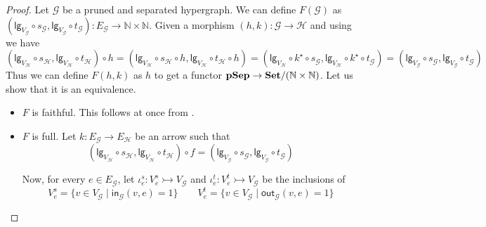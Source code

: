 \documentclass[3p]{elsarticle}
\newcommand{\lgh}{\mathsf{lg}}
\newcommand{\ind}[1]{\mathsf{in}_{\mathcal{#1}}}
\newcommand{\outd}[1]{\mathsf{out}_{\mathcal{#1}}}
\newcommand{\Set}{\mathbf{Set}}
\newcommand{\catname}[1]{\textbf{\textup{#1}}}
\newcommand{\pshyp}{\catname{pSep}}
\newcommand{\mto}{\rightarrowtail}
\theoremstyle{remark}
\theoremstyle{definition}
\begin{document}
\begin{proof}{\label{proof:pruned}}
	Let $\mathcal{G}$ be a pruned and separated hypergraph. We can define $F(\mathcal{G})$ as $(\lgh_{V_{\mathcal{G}}}\circ s_{\mathcal{G}}, \lgh_{V_{\mathcal{G}}}\circ t_{\mathcal{G}}) \colon E_{\mathcal{G}}\to \mathbb{N}\times \mathbb{N}$. Given a morphism $(h,k)\colon \mathcal{G}\to \mathcal{H}$ and using  we	have
	\[(\lgh_{V_{\mathcal{H}}}\circ s_{\mathcal{H}}, \lgh_{V_{\mathcal{H}}}\circ t_{\mathcal{H}})\circ h = (\lgh_{V_{\mathcal{H}}}\circ s_{\mathcal{H}}\circ h, \lgh_{V_{\mathcal{H}}}\circ t_{\mathcal{H}}\circ h)=(\lgh_{V_{\mathcal{H}}}\circ k^\star\circ s_{\mathcal{G}}, \lgh_{V_{\mathcal{H}}}\circ k^\star\circ t_{\mathcal{G}})= (\lgh_{V_{\mathcal{G}}}\circ s_{\mathcal{G}}, \lgh_{V_{\mathcal{G}}}\circ t_{\mathcal{G}})\]
	Thus we can define $F(h,k)$ as $h$ to get a functor $\pshyp\to \Set/(\mathbb{N}\times \mathbb{N})$. Let us show that it is an equivalence.
	\begin{itemize}
		\item $F$ is faithful. This follows at once from .
		\item $F$ is full. Let $k\colon E_{\mathcal{G}}\to E_{\mathcal{H}}$ be an arrow such that 
		\[(\lgh_{V_{\mathcal{H}}}\circ s_{\mathcal{H}}, \lgh_{V_{\mathcal{H}}}\circ t_{\mathcal{H}})\circ f =(\lgh_{V_{\mathcal{G}}}\circ s_{\mathcal{G}}, \lgh_{V_{\mathcal{G}}}\circ t_{\mathcal{G}})\]
		
		Now, for every $e \in E_\mathcal{G}$, let $\iota^s_e\colon V^s_e\mto V_{\mathcal{G}}$ and $\iota^t_e\colon V^t_e\mto V_{\mathcal{G}}$ be the inclusions of
		\[V^s_e=\{v \in V_{\mathcal{G}} \mid \ind{G}(v,e)=1\} \qquad V^t_e=\{v \in V_{\mathcal{G}} \mid \outd{G}(v,e)=1\}\]
		

\end{itemize}
\end{proof}
\end{document}
